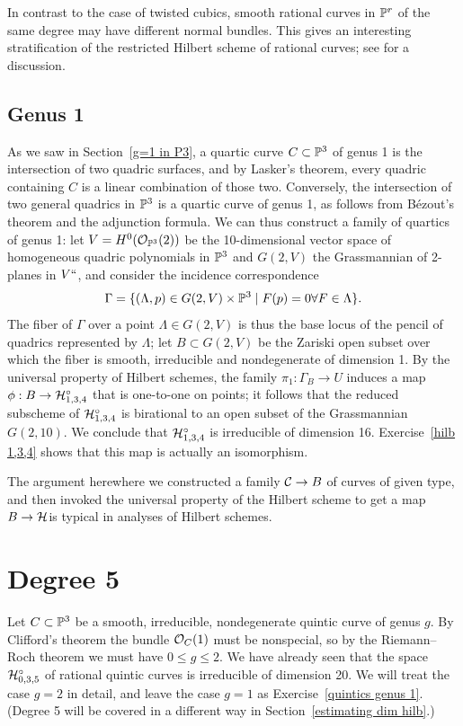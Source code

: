 In contrast to the case of twisted cubics, smooth rational curves in
$\mathbb P^r$ of the same degree may have different normal bundles. This gives
an interesting stratification of the restricted Hilbert scheme of rational
%
%
curves; see \cite{MR3778979} for a discussion.

\subsection*{Genus 1}
 As we saw in Section~\ref{g=1 in P3}, a quartic curve $C \subset \mathbb P^3$
 of genus 1 is the intersection of two quadric surfaces, and by Lasker's
 theorem, every quadric containing $C$ is a linear combination of those
 two. Conversely, the intersection of two general quadrics in $\mathbb P^3$ is
 a quartic curve of genus 1, as follows from B\'ezout's theorem and the
 adjunction formula. We can thus construct a family of quartics of genus
 1: let $V = H^0({\mathcal O}_{\mathbb P^3}(2))$ be the 10-dimensional vector space of
 homogeneous quadric polynomials in $\mathbb P^3$ and $G(2,V)$ the
Grassmannian of 2-planes
%
in $V` `$, and consider the
incidence correspondence
%
$$
\Gamma = \{ (\Lambda, p) \in G(2,V) \times \mathbb P^3 \mid F(p)=0 \relax \forall \relax
F \in \Lambda \}.
$$
The fiber of $\Gamma$ over a point $\Lambda \in G(2,V)$ is thus the
base locus of the pencil of quadrics represented by $\Lambda$; let $B
\subset G(2,V)$ be the Zariski open subset over which the fiber is smooth,
irreducible and nondegenerate of dimension 1. By the universal property of
Hilbert schemes, the family $\pi_1 : \Gamma_B \to U$ induces a map $\phi :
B \to \mathcal H^\circ_{1,3,4}$ that is one-to-one on points; it follows that the
reduced subscheme of $\mathcal H^\circ_{1,3,4}$ is birational to an open subset
of the Grassmannian $G(2,10)$. We conclude that $\mathcal H^\circ_{1,3,4}$
is irreducible of dimension 16. Exercise~\ref{hilb 1,3,4} shows that
this map is actually an isomorphism.

The  argument  here\emdash where we constructed a family $\mathcal C \to B$ of
curves of given type, and then invoked the universal property of the
Hilbert scheme to get a map $B \to \mathcal H$\emdash is typical in analyses of
Hilbert schemes.

\section{Degree 5}

Let $C \subset \mathbb P^3$ be a smooth, irreducible, nondegenerate quintic
curve of genus $g$. By Clifford's theorem the bundle ${\mathcal O}_C(1)$ must
be nonspecial, so  by the Riemann--Roch theorem we must have $0\leq
g \leq 2$. We have already seen that the space $\mathcal H^\circ_{0,3,5}$
of rational quintic curves is irreducible of dimension 20. We
will treat the case $g=2$ in detail, and leave the case $g=1$ as
Exercise~\ref{quintics genus 1}. (Degree 5 will be covered in a different
way in Section~\ref{estimating dim hilb}.)

